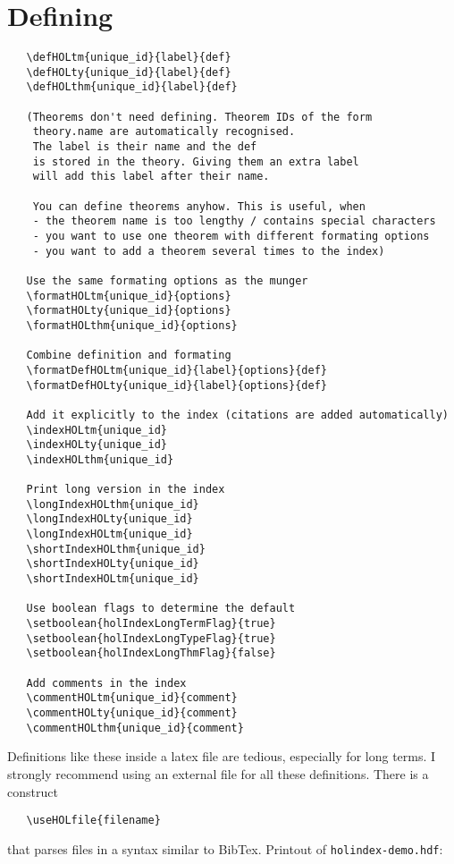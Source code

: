 \documentclass{article}
\begin{document}
\section{Defining}
\begin{verbatim}
   \defHOLtm{unique_id}{label}{def}
   \defHOLty{unique_id}{label}{def}
   \defHOLthm{unique_id}{label}{def}

   (Theorems don't need defining. Theorem IDs of the form
    theory.name are automatically recognised.
    The label is their name and the def
    is stored in the theory. Giving them an extra label
    will add this label after their name.

    You can define theorems anyhow. This is useful, when
    - the theorem name is too lengthy / contains special characters
    - you want to use one theorem with different formating options
    - you want to add a theorem several times to the index)

   Use the same formating options as the munger
   \formatHOLtm{unique_id}{options}
   \formatHOLty{unique_id}{options}
   \formatHOLthm{unique_id}{options}

   Combine definition and formating
   \formatDefHOLtm{unique_id}{label}{options}{def}
   \formatDefHOLty{unique_id}{label}{options}{def}

   Add it explicitly to the index (citations are added automatically)
   \indexHOLtm{unique_id}
   \indexHOLty{unique_id}
   \indexHOLthm{unique_id}

   Print long version in the index
   \longIndexHOLthm{unique_id}
   \longIndexHOLty{unique_id}
   \longIndexHOLtm{unique_id}
   \shortIndexHOLthm{unique_id}
   \shortIndexHOLty{unique_id}
   \shortIndexHOLtm{unique_id}

   Use boolean flags to determine the default
   \setboolean{holIndexLongTermFlag}{true}
   \setboolean{holIndexLongTypeFlag}{true}
   \setboolean{holIndexLongThmFlag}{false}

   Add comments in the index
   \commentHOLtm{unique_id}{comment}
   \commentHOLty{unique_id}{comment}
   \commentHOLthm{unique_id}{comment}
\end{verbatim}
%
Definitions like these inside a latex file are tedious,
especially for long terms. I strongly recommend using
an external file for all these definitions. There
is a construct
\begin{verbatim}
   \useHOLfile{filename}
\end{verbatim}
that parses files in a syntax similar to BibTex.
Printout of \texttt{holindex-demo.hdf}:
\end{document}
